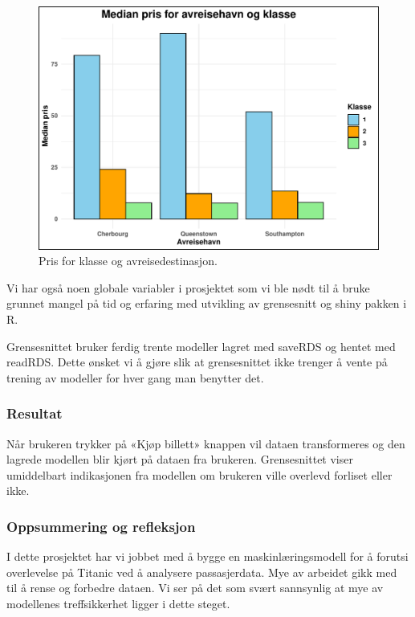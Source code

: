 \documentclass[
]{article}
\begin{document}
\begin{figure}[H]

{\centering \includegraphics[width=0.8\linewidth]{presentation_files/figure-latex/unnamed-chunk-13-1} 

}

\caption{Pris for klasse og avreisedestinasjon.}\label{fig:unnamed-chunk-13}
\end{figure}

Vi har også noen globale variabler i prosjektet som vi ble nødt til å
bruke grunnet mangel på tid og erfaring med utvikling av grensesnitt og
shiny pakken i R.

Grensesnittet bruker ferdig trente modeller lagret med saveRDS og hentet
med readRDS. Dette ønsket vi å gjøre slik at grensesnittet ikke trenger
å vente på trening av modeller for hver gang man benytter det.

\subsubsection{Resultat}\label{resultat}

Når brukeren trykker på «Kjøp billett» knappen vil dataen transformeres
og den lagrede modellen blir kjørt på dataen fra brukeren. Grensesnittet
viser umiddelbart indikasjonen fra modellen om brukeren ville overlevd
forliset eller ikke.

\subsubsection{Oppsummering og
refleksjon}\label{oppsummering-og-refleksjon}

I dette prosjektet har vi jobbet med å bygge en maskinlæringsmodell for
å forutsi overlevelse på Titanic ved å analysere passasjerdata. Mye av
arbeidet gikk med til å rense og forbedre dataen. Vi ser på det som
svært sannsynlig at mye av modellenes treffsikkerhet ligger i dette
steget.
\end{document}
